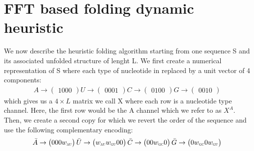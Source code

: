 \documentclass[a4paper,12pt]{article}
\begin{document}
\section{FFT based folding dynamic heuristic}
\label{sec:org47bec4d}
We now describe the heuristic folding algorithm starting from one sequence S and
its associated unfolded structure of lenght L. We first create a numerical
representation of S where each type of nucleotide in replaced by a unit vector
of 4 components:
\begin{equation}
\begin{split}
A \rightarrow \begin{pmatrix} 1 0 0 0 \end{pmatrix}
U \rightarrow \begin{pmatrix} 0 0 0 1 \end{pmatrix}
C \rightarrow \begin{pmatrix} 0 1 0 0 \end{pmatrix}
G \rightarrow \begin{pmatrix} 0 0 1 0 \end{pmatrix}
\end{split}
\end{equation}
which gives us a \(4 \times L\) matrix we call X where each row is a nucleotide
type channel. Here, the first row would be the A channel which we refer to as
\(X^A\). Then, we create a second copy for which we revert the order of the
sequence and use the following complementary encoding:
\begin{equation}
\begin{split}
\bar{A} \rightarrow \begin{pmatrix} 0 0 0 w_{\scalebox{0.5}{AU}} \end{pmatrix}
\bar{U} \rightarrow \begin{pmatrix} w_{\scalebox{0.5}{AU}} w_{\scalebox{0.5}{GU}} 0 0 \end{pmatrix}
\bar{C} \rightarrow \begin{pmatrix} 0 0 w_{\scalebox{0.5}{GC}} 0 \end{pmatrix}
\bar{G} \rightarrow \begin{pmatrix} 0 w_{\scalebox{0.5}{GC}} 0 w_{\scalebox{0.5}{GU}} \end{pmatrix}
\end{split}
\end{equation}
\end{document}
